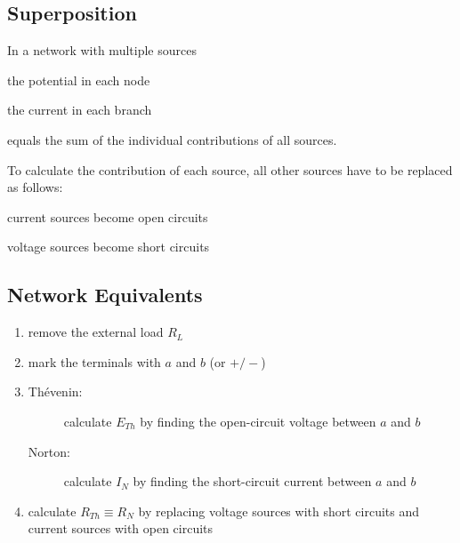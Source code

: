 
\subsection{Superposition} %
	
	In a network with multiple sources
	\begin{tightitemize}
		\item the potential in each node
		\item the current in each branch
	\end{tightitemize}
	equals the sum of the individual contributions of all sources.
	
	To calculate the contribution of each source, all other sources have to be replaced as follows:
	\begin{tightitemize}
		\item current sources become open circuits
		\item voltage sources become short circuits
	\end{tightitemize}
	

\subsection{Network Equivalents} %
	
	
	\begin{enumerate}
		\item remove the external load $R_L$
		\item mark the terminals with $a$ and $b$ (or $+/-$)
		\item 
			\begin{description}
				\item[Thévenin:] calculate $E_{Th}$ by finding the open-circuit voltage between $a$ and $b$
				\item[Norton:] calculate $I_N$ by finding the short-circuit current between $a$ and $b$
			\end{description}
		\item calculate $R_{Th} \equiv R_N$ by replacing voltage sources with short circuits and current sources with open circuits
	\end{enumerate}
	
